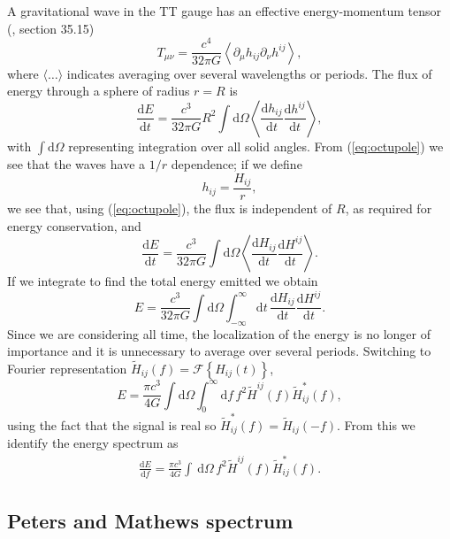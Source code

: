 \documentclass[useAMS,usedcolumn,usegraphicx,usenatbib]{mn2e}
\newcommand{\eqnref}[1]{(\ref{eq:#1})}
\newcommand{\dd}{\ensuremath{\mathrm{d}}}
\newcommand{\diff}[2]{\ensuremath{\frac{\dd {#1}}{\dd {#2}}}}
\newcommand{\intd}[4]{\ensuremath{\int_{#1}^{#2}{#3}\,\dd{#4}}}
\begin{document}
A gravitational wave in the TT gauge has an effective energy-momentum tensor (\citealt{Misner1973}, section 35.15)
\begin{equation}
T_{\mu\nu} = \frac{c^4}{32\pi G}\left\langle\partial_\mu h_{ij} \partial_\nu h^{ij}\right\rangle,
\end{equation}
where $\langle\ldots\rangle$ indicates averaging over several wavelengths or periods. The flux of energy through a sphere of radius $r = R$ is
\begin{equation}
\diff{E}{t} = \frac{c^3}{32\pi G} R^2 \int{\dd\Omega}\left\langle\diff{h_{ij}}{t}\diff{h^{ij}}{t}\right\rangle,
\end{equation}
with $\int{\dd\Omega}$ representing integration over all solid angles. From \eqnref{octupole} we see that the waves have a $1/{r}$ dependence; if we define
\begin{equation}
h_{ij} = \frac{H_{ij}}{r},
\end{equation}
we see that, using \eqnref{octupole}, the flux is independent of $R$, as required for energy conservation, and
\begin{equation}
\diff{E}{t} = \frac{c^3}{32\pi G} \int{\dd\Omega}\left\langle\diff{H_{ij}}{t}\diff{H^{ij}}{t}\right\rangle.
\end{equation}
If we integrate to find the total energy emitted we obtain
\begin{equation}
E = \frac{c^3}{32\pi G} \int{\dd\Omega}\int_{-\infty}^{\infty}{\dd t} \, \diff{H_{ij}}{t}\diff{H^{ij}}{t}.
\label{eq:integrate_E}
\end{equation}
Since we are considering all time, the localization of the energy is no longer of importance and it is unnecessary to average over several periods. Switching to Fourier representation $\widetilde{H}_{ij}(f) = \mathscr{F}\left\{H_{ij}(t)\right\}$,
\begin{equation}
E = \frac{\pi c^3}{4 G} \int{\dd\Omega}\int_{0}^{\infty}{\dd f} \, f^2 \widetilde{H}^{ij}(f)\widetilde{H}_{ij}^*(f),
\label{eq:total_E}
\end{equation}
using the fact that the signal is real so $\widetilde{H}_{ij}^*(f) = \widetilde{H}_{ij}(-f)$. From this we identify the energy spectrum as
\begin{align}
\diff{E}{f} = \frac{\pi c^3}{4 G} \intd{}{}{}{\Omega} \, f^2 \widetilde{H}^{ij}(f)\widetilde{H}_{ij}^*(f).
\label{eq:NK_dEdf}
\end{align}

\subsection{Peters and Mathews spectrum}
\end{document}
